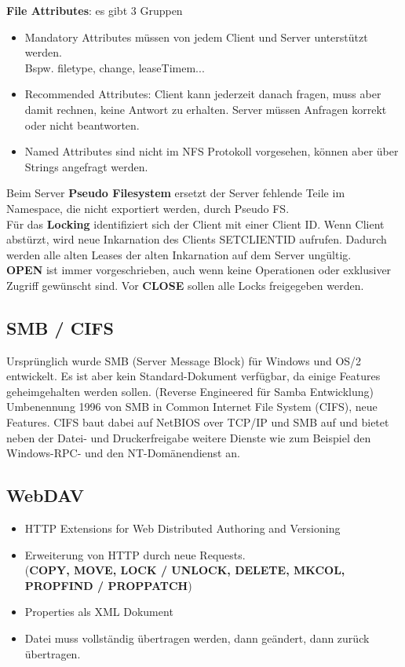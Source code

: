 \documentclass{article} %
\begin{document}
\noindent\textbf{File Attributes}: es gibt 3 Gruppen
	\begin{itemize}
	\item Mandatory Attributes müssen von jedem Client und Server unterstützt werden.\\
	Bspw. filetype, change, leaseTimem...
	\item Recommended Attributes: Client kann jederzeit danach fragen, muss aber damit rechnen, keine Antwort zu erhalten. Server müssen Anfragen korrekt oder nicht beantworten.
	\item Named Attributes sind nicht im NFS Protokoll vorgesehen, können aber über Strings angefragt werden. 
	\end{itemize}

\noindent Beim Server \textbf{Pseudo Filesystem}  ersetzt der Server  fehlende Teile im Namespace, die nicht exportiert werden, durch Pseudo FS.\\

\noindent Für das \textbf{Locking} identifiziert sich der Client mit einer Client ID. Wenn Client abstürzt, wird neue Inkarnation des Clients SETCLIENTID aufrufen. Dadurch werden alle alten Leases der alten Inkarnation auf dem Server ungültig.\\

\noindent\textbf{OPEN} ist immer vorgeschrieben, auch wenn keine Operationen oder exklusiver Zugriff gewünscht sind. Vor \textbf{CLOSE} sollen alle Locks freigegeben werden.
 
\subsection{SMB / CIFS}
Ursprünglich wurde SMB (Server Message Block) für Windows und OS/2 entwickelt. Es ist aber kein Standard-Dokument verfügbar, da einige Features geheimgehalten werden sollen. (Reverse Engineered für Samba Entwicklung)\\
Umbenennung 1996 von SMB in Common Internet File System (CIFS), neue Features. 
CIFS baut dabei auf NetBIOS over TCP/IP und SMB auf und bietet neben der Datei- und Druckerfreigabe weitere Dienste wie zum Beispiel den Windows-RPC- und den NT-Domänendienst an. 
\subsection{WebDAV}
	\begin{itemize}
	\item HTTP Extensions for Web Distributed Authoring and Versioning \cite{rfc4918}
	\item Erweiterung von HTTP durch neue Requests. \\
	(\textbf{COPY, MOVE, LOCK / UNLOCK, DELETE, MKCOL, PROPFIND / PROPPATCH})
	\item Properties als XML Dokument 
	\item Datei muss vollständig übertragen werden, dann geändert, dann zurück übertragen. 
	\end{itemize}
\end{document}
